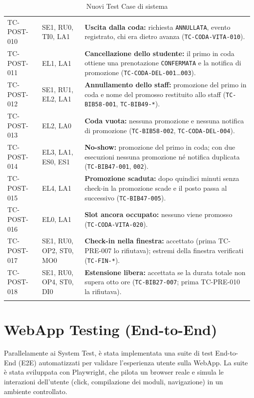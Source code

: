 \documentclass[11pt,a4paper,oneside,openany]{book}
\begin{document}
{\begin{xltabular}{\linewidth}{L{2.2cm}L{3.4cm}Y}
  TC-POST-010 & SE1, RU0, TI0, LA1 &
  \textbf{Uscita dalla coda:} richiesta \texttt{ANNULLATA}, evento
  registrato, chi era dietro avanza (\texttt{TC-CODA-VITA-010}). \\
  TC-POST-011 & EL1, LA1 &
  \textbf{Cancellazione dello studente:} il primo in coda ottiene una
  prenotazione \texttt{CONFERMATA} e la notifica di promozione
  (\texttt{TC-CODA-DEL-001}\dots\texttt{003}). \\
  TC-POST-012 & SE1, RU1, EL2, LA1 &
  \textbf{Annullamento dello staff:} promozione del primo in coda e nome del
  promosso restituito allo staff (\texttt{TC-BIB58-001}, \texttt{TC-BIB49-*}). \\
  TC-POST-013 & EL2, LA0 &
  \textbf{Coda vuota:} nessuna promozione e nessuna notifica di promozione
  (\texttt{TC-BIB58-002}, \texttt{TC-CODA-DEL-004}). \\
  TC-POST-014 & EL3, LA1, ES0, ES1 &
  \textbf{No-show:} promozione del primo in coda; con due esecuzioni nessuna
  promozione né notifica duplicata (\texttt{TC-BIB47-001}, \texttt{002}). \\
  TC-POST-015 & EL4, LA1 &
  \textbf{Promozione scaduta:} dopo quindici minuti senza check-in la
  promozione scade e il posto passa al successivo (\texttt{TC-BIB47-005}). \\
  TC-POST-016 & EL0, LA1 &
  \textbf{Slot ancora occupato:} nessuno viene promosso
  (\texttt{TC-CODA-VITA-020}). \\
  TC-POST-017 & SE1, RU0, OP2, ST0, MO0 &
  \textbf{Check-in nella finestra:} accettato (prima TC-PRE-007 lo
  rifiutava); estremi della finestra verificati (\texttt{TC-FIN-*}). \\
  TC-POST-018 & SE1, RU0, OP4, ST0, DI0 &
  \textbf{Estensione libera:} accettata se la durata totale non supera otto
  ore (\texttt{TC-BIB27-007}; prima TC-PRE-010 la rifiutava). \\
  \bottomrule
  \caption{Nuovi Test Case di sistema}\label{tab:tc-post}\\
\end{xltabular}}

\chapter{WebApp Testing (End-to-End)}

Parallelamente ai System Test, è stata implementata una suite di test
End-to-End (E2E) automatizzati per validare l'esperienza utente sulla WebApp.
La suite è stata sviluppata con Playwright, che pilota un browser reale e
simula le interazioni dell'utente (click, compilazione dei moduli,
navigazione) in un ambiente controllato.
\end{document}
